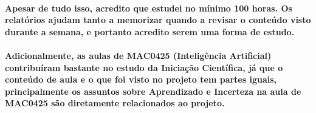 \documentclass[a4paper,10pt]{article}
\theoremstyle{plain}
\begin{document}
\paragraph{
  Apesar de tudo isso, acredito que estudei no mínimo 100 horas. Os relatórios ajudam tanto a
  memorizar quando a revisar o conteúdo visto durante a semana, e portanto acredito serem uma forma
  de estudo.
}

\paragraph{
  Adicionalmente, as aulas de MAC0425 (Inteligência Artificial) contribuíram bastante no estudo da
  Iniciação Científica, já que o conteúdo de aula e o que foi visto no projeto tem partes iguais,
  principalmente os assuntos sobre Aprendizado e Incerteza na aula de MAC0425 são diretamente
  relacionados ao projeto.
}

\newpage

\printbibliography
\end{document}
